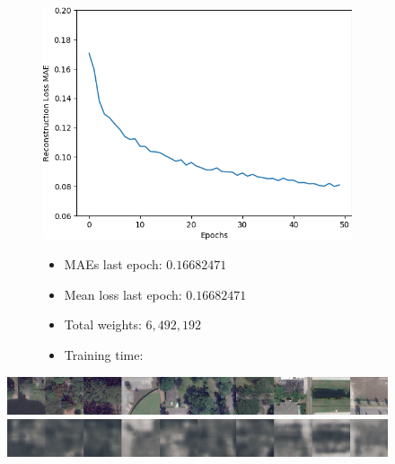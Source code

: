 \begin{figure}[H]
    \centering
    \begin{subfigure}{.5\textwidth}
        \centering
        \includegraphics[width=\textwidth]
        {images/figures/experiments_architecture/mae_graphKernel3adjusted2x2x256_dim1024.png}
    \end{subfigure}%
    \begin{subfigure}{.5\textwidth}
      \begin{itemize}
          \item MAEs last epoch: $0.16682471$
          \item Mean loss last epoch: $0.16682471$
          \item Total weights: $6,492,192$
          \item Training time:
      \end{itemize}
    \end{subfigure}
\end{figure}

\vspace{-2em}

\begin{figure}[H]
    \centering
    \includegraphics[width=\textwidth]
    {images/figures/experiments_architecture/inputsKernel3adjusted2x2x256_dim1024.png}
    \includegraphics[width=\textwidth]
    {images/figures/experiments_architecture/reconstructionsKernel3adjusted2x2x256_dim1024.png}
\end{figure}

